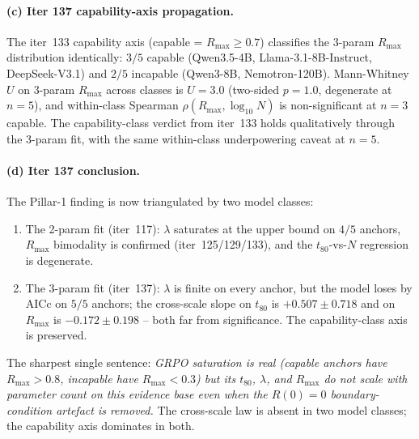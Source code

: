 \paragraph{(c) Iter 137 capability-axis propagation.}
\label{par:scaling-iter137-capability}

The iter~133 capability axis (capable = $R_{\max} \ge 0.7$)
classifies the 3-param $R_{\max}$ distribution identically:
$3/5$ capable (Qwen3.5-4B, Llama-3.1-8B-Instruct,
DeepSeek-V3.1) and $2/5$ incapable (Qwen3-8B, Nemotron-120B).
Mann-Whitney $U$ on 3-param $R_{\max}$ across classes is
$U = 3.0$ (two-sided $p = 1.0$, degenerate at $n = 5$), and
within-class Spearman $\rho(R_{\max}, \log_{10} N)$ is
non-significant at $n = 3$ capable.  The capability-class
verdict from iter~133 holds qualitatively through the 3-param
fit, with the same within-class underpowering caveat at
$n = 5$.

\paragraph{(d) Iter 137 conclusion.}
\label{par:scaling-iter137-conclusion}

The Pillar-1 finding is now triangulated by two model classes:
\begin{enumerate}
  \item The 2-param fit (iter~117): $\lambda$ saturates at the
    upper bound on $4/5$ anchors, $R_{\max}$ bimodality is
    confirmed (iter~125/129/133), and the $t_{80}$-vs-$N$
    regression is degenerate.
  \item The 3-param fit (iter~137): $\lambda$ is finite on
    every anchor, but the model loses by AICc on $5/5$ anchors;
    the cross-scale slope on $t_{80}$ is $+0.507 \pm 0.718$ and
    on $R_{\max}$ is $-0.172 \pm 0.198$ -- both far from
    significance.  The capability-class axis is preserved.
\end{enumerate}
The sharpest single sentence: \emph{GRPO saturation is real
(capable anchors have $R_{\max} > 0.8$, incapable have
$R_{\max} < 0.3$) but its $t_{80}$, $\lambda$, and $R_{\max}$
do not scale with parameter count on this evidence base even
when the $R(0)=0$ boundary-condition artefact is removed.}
The cross-scale law is absent in two model classes; the
capability axis dominates in both.


